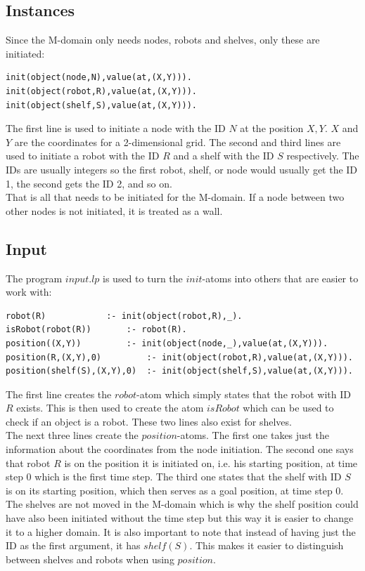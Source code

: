 \documentclass[runningheads]{llncs}
\begin{document}
\subsection{Instances}
 Since the M-domain only needs nodes, robots and shelves, only these are initiated:
\begin{verbatim}
init(object(node,N),value(at,(X,Y))).
init(object(robot,R),value(at,(X,Y))).
init(object(shelf,S),value(at,(X,Y))).
\end{verbatim}
The first line is used to initiate a node with the ID $N$ at the position $X, Y$. $X$ and $Y$ are the coordinates for a 2-dimensional grid. The second and third lines are used to initiate a robot with the ID $R$ and a shelf with the ID $S$ respectively. The IDs are usually integers so the first robot, shelf, or node would usually get the ID 1, the second gets the ID 2, and so on. \\
That is all that needs to be initiated for the M-domain. If a node between two other nodes is not initiated, it is treated as a wall.
\subsection{Input}
The program $input.lp$ is used to turn the $init$-atoms into others that are easier to work with:
\begin{verbatim}
robot(R) 			:- init(object(robot,R),_).
isRobot(robot(R)) 		:- robot(R).
position((X,Y))   		:- init(object(node,_),value(at,(X,Y))).
position(R,(X,Y),0) 		:- init(object(robot,R),value(at,(X,Y))).
position(shelf(S),(X,Y),0)	:- init(object(shelf,S),value(at,(X,Y))).
\end{verbatim}
The first line creates the $robot$-atom which simply states that the robot with ID $R$ exists. This is then used to create the atom $isRobot$ which can be used to check if an object is a robot. These two lines also exist for shelves. \\
The next three lines create the $position$-atoms. The first one takes just the information about the coordinates from the node initiation. The second one says that robot $R$ is on the position it is initiated on, i.e. his starting position, at time step 0 which is the first time step. The third one states that the shelf with ID $S$ is on its starting position, which then serves as a goal position, at time step 0. The shelves are not moved in the M-domain which is why the shelf position could have also been initiated without the time step but this way it is easier to change it to a higher domain. It is also important to note that instead of having just the ID as the first argument, it has $shelf(S)$. This makes it easier to distinguish between shelves and robots when using $position$.
\end{document}

